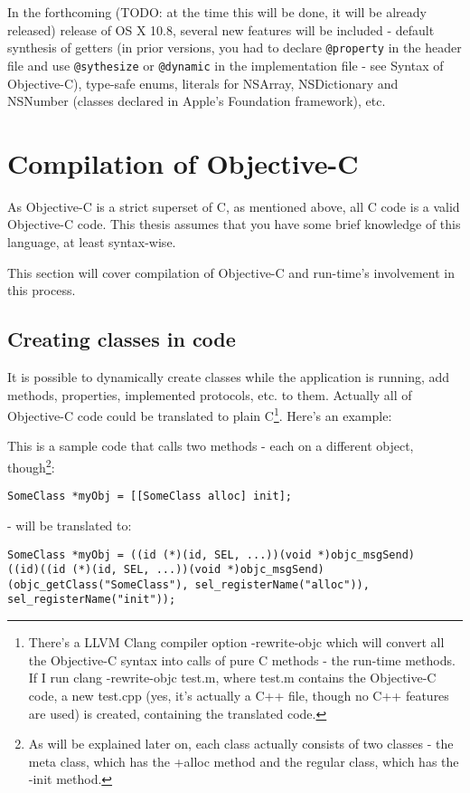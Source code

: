 \documentclass[a4paper, 11pt, fleqn]{book}
\begin{document}
In the forthcoming (TODO: at the time this will be done, it will be already released) release of OS X 10.8, several new features will be included - default synthesis of getters (in prior versions, you had to declare \verb=@property= in the header file and use \verb=@sythesize= or \verb=@dynamic= in the implementation file - see Syntax of Objective-C), type-safe enums, literals for NSArray, NSDictionary and NSNumber (classes declared in Apple's Foundation framework), etc.

\section{Compilation of Objective-C}

As Objective-C is a strict superset of C, as mentioned above, all C code is a valid Objective-C code. This thesis assumes that you have some brief knowledge of this language, at least syntax-wise.

This section will cover compilation of Objective-C and run-time's involvement in this process.

\subsection{Creating classes in code}

It is possible to dynamically create classes while the application is running, add methods, properties, implemented protocols, etc. to them. Actually all of Objective-C code could be translated to plain C\footnote{There's a LLVM Clang compiler option -rewrite-objc which will convert all the Objective-C syntax into calls of pure C methods - the run-time methods. If I run clang -rewrite-objc test.m, where test.m contains the Objective-C code, a new test.cpp (yes, it's actually a C++ file, though no C++ features are used) is created, containing the translated code.}. Here's an example:


This is a sample code that calls two methods - each on a different object, though\footnote{As will be explained later on, each class actually consists of two classes - the meta class, which has the +alloc method and the regular class, which has the -init method.}:
\begin{verbatim}SomeClass *myObj = [[SomeClass alloc] init];\end{verbatim}

- will be translated to:

\begin{verbatim}SomeClass *myObj = ((id (*)(id, SEL, ...))(void *)objc_msgSend)
((id)((id (*)(id, SEL, ...))(void *)objc_msgSend)
(objc_getClass("SomeClass"), sel_registerName("alloc")), 
sel_registerName("init"));\end{verbatim}
\end{document}
